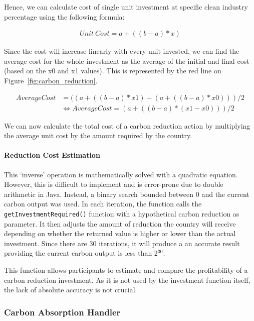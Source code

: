  
Hence, we can calculate cost of single unit investment at specific clean industry percentage using the following formula:

\begin{align*}
Unit~Cost = a + ((b - a) * x)
\end{align*}

Since the cost will increase linearly with every unit invested, we can find the average cost for the whole investment as the average of the initial and final cost (based on the x0 and x1 values). This is represented by the red line on Figure~\ref{fig:carbon_reduction}.
 
\begin{align*}
Average Cost &= ((a + ((b - a) * x1) - (a + ((b-a) * x0))) / 2 \\
&\Leftrightarrow Average  Cost = (a + ((b - a) * (x1 - x0))) / 2
\end{align*}

We can now calculate the total cost of a carbon reduction action by multiplying the average unit cost by the amount required by the country.

\paragraph{Reduction Cost Estimation}

This `inverse' operation is mathematically solved with a quadratic equation. However, this is difficult to implement and is error-prone due to double arithmetic in Java. Instead, a binary search bounded between 0 and the current carbon output was used. In each iteration, the function calls the \texttt{getInvestmentRequired()} function with a hypothetical carbon reduction as parameter. It then adjusts the amount of reduction the country will receive depending on whether the returned value is higher or lower than the actual investment. Since there are 30 iterations, it will produce a an accurate result providing the current carbon output is less than 2$^{30}$.
  
This function allows participants to estimate and compare the profitability of a carbon reduction investment. As it is not used by the investment function itself, the lack of absolute accuracy is not crucial.

\subsubsection{Carbon Absorption Handler}

